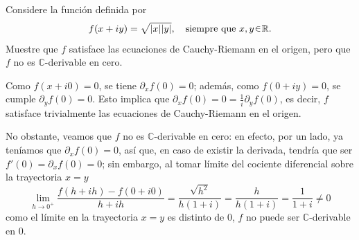 \setcounter{eje}{11}
\begin{ejer}
Considere la función definida por
\[ 
f(x+ iy) = \sqrt{|x||y|}, \quad \text{siempre que } x, y \en \mathbb{R}. 
\]
Muestre que $f$ satisface las ecuaciones de Cauchy-Riemann en el origen, pero que $f$ no es $\mathbb{C}$-derivable en cero.
\end{ejer}
\begin{sol}
Como $f(x+i0) = 0$, se tiene $\partial_xf(0) = 0$; además, como $f(0+iy) = 0$, se cumple $\partial_yf(0)=0$. Esto implica que $\partial_xf(0) = 0 = \frac{1}{i}\partial_yf(0)$, es decir, $f$ satisface trivialmente las ecuaciones de Cauchy-Riemann en el origen.\par
No obstante, veamos que $f$ no es $\mathbb{C}$-derivable en cero:
en efecto, por un lado, ya teníamos que $\partial_xf(0) = 0$, así que, en caso de existir la derivada, tendría que ser $f'(0) = \partial_xf(0) = 0$; sin embargo, al tomar límite del cociente diferencial sobre la trayectoria $x=y$
\[
\lim_{h\to0^+} \frac{f(h+ih)- f(0+i0)}{h+ih} = \frac{\sqrt{h^2}}{h(1+i)} = \frac{h}{h(1+i)} = \frac{1}{1+i} \neq 0
\]
como el límite en la trayectoria $x=y$ es distinto de $0$, $f$ no puede ser $\mathbb{C}$-derivable en $0$.
\end{sol}